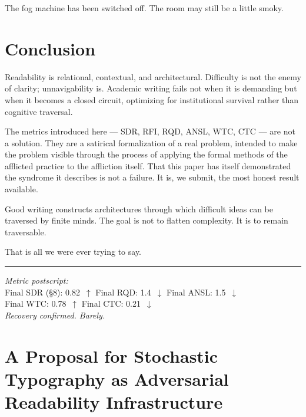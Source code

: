 \documentclass[12pt, a4paper]{article}
\begin{document}
The fog machine has been switched off. The room may still be a little smoky.


\section{Conclusion}

Readability is relational, contextual, and architectural. Difficulty is not the enemy of clarity; unnavigability is. Academic writing fails not when it is demanding but when it becomes a closed circuit, optimizing for institutional survival rather than cognitive traversal.

The metrics introduced here --- SDR, RFI, RQD, ANSL, WTC, CTC --- are not a solution. They are a satirical formalization of a real problem, intended to make the problem visible through the process of applying the formal methods of the afflicted practice to the affliction itself. That this paper has itself demonstrated the syndrome it describes is not a failure. It is, we submit, the most honest result available.

Good writing constructs architectures through which difficult ideas can be traversed by finite minds. The goal is not to flatten complexity. It is to remain traversable.

That is all we were ever trying to say.

\bigskip
\noindent\rule{\linewidth}{0.5pt}

\begin{center}
\textit{Metric postscript:}\\[0.4em]
Final SDR (\S8): 0.82\ $\uparrow$\quad
Final RQD: 1.4\ $\downarrow$\quad
Final ANSL: 1.5\ $\downarrow$\\[0.2em]
Final WTC: 0.78\ $\uparrow$\quad
Final CTC: 0.21\ $\downarrow$\\[0.6em]
\textit{Recovery confirmed. Barely.}
\end{center}


\appendix
\section{A Proposal for Stochastic Typography as Adversarial Readability Infrastructure}
\end{document}
